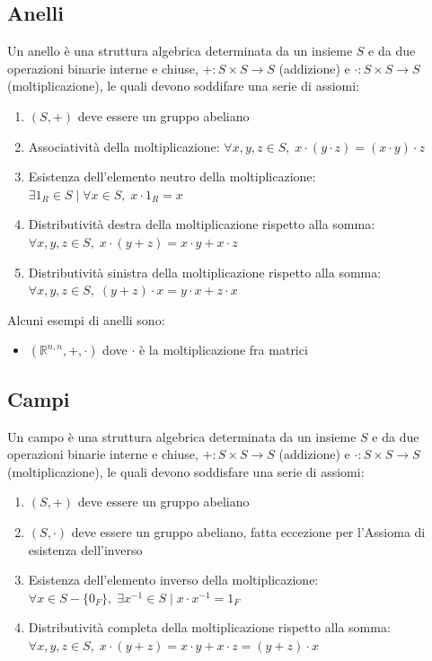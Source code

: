 \documentclass{article}
\begin{document}
\subsection{Anelli}
    Un anello è una struttura algebrica determinata da un insieme $S$ e da due operazioni binarie interne e chiuse, $+: S \times S \rightarrow S$ (addizione) e $\cdot : S \times S \rightarrow S$ (moltiplicazione), le quali devono soddifare una serie di assiomi:
    \begin{enumerate}[label=(\arabic*)]
        \item $(S, +)$ deve essere un gruppo abeliano
        \item Associatività della moltiplicazione: $\forall x, y, z \in S, \; x \cdot (y \cdot z) = (x \cdot y) \cdot z$
        \item Esistenza dell'elemento neutro della moltiplicazione: $\exists 1_R \in S \; | \; \forall x \in S, \; x \cdot 1_R = x$
        \item Distributività destra della moltiplicazione rispetto alla somma: $\forall x, y, z \in S, \; x \cdot (y + z) = x \cdot y + x \cdot z$
        \item Distributività sinistra della moltiplicazione rispetto alla somma: $\forall x, y, z \in S, \; (y + z) \cdot x = y \cdot x + z \cdot x$
    \end{enumerate}

    \vspace{10pt}
    Alcuni esempi di anelli sono:
    \begin{itemize}
        \item $(\mathbb{R}^{n, n}, +, \cdot)$ dove $\cdot$ è la moltiplicazione fra matrici 
    \end{itemize}



\subsection{Campi}
    Un campo è una struttura algebrica determinata da un insieme $S$ e da due operazioni binarie interne e chiuse, $+ : S \times S \rightarrow S$ (addizione)  e $\cdot : S \times S \rightarrow S$ (moltiplicazione), le quali devono soddisfare una serie di assiomi:
    \begin{enumerate}[label=(\arabic*)]
        \item $(S, +)$ deve essere un gruppo abeliano 
        \item $(S, \cdot)$ deve essere un gruppo abeliano, fatta eccezione per l'Assioma di esistenza dell'inverso
        \item Esistenza dell'elemento inverso della moltiplicazione: $\forall x \in S - \{0_F\}, \; \exists x^{-1} \in S \; | \; x \cdot x^{-1} = 1_F$ 
        \item Distributività completa della moltiplicazione rispetto alla somma: $\forall x, y, z \in S, \; x \cdot (y + z) = x \cdot y + x \cdot z = (y + z) \cdot x$
    \end{enumerate}
\end{document}
